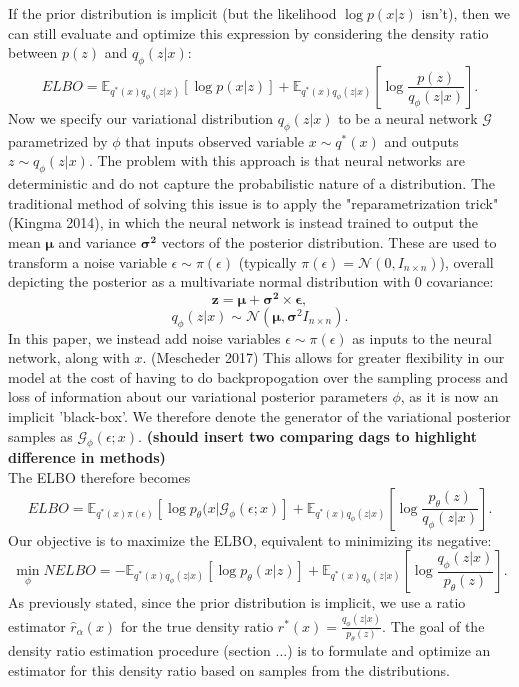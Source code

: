 \documentclass[a4paper,12pt]{article}
\numberwithin{equation}{section}
\begin{document}
If the prior distribution is implicit (but the likelihood $\log p(x|z)$ isn't), then we can still evaluate and optimize this expression by considering the density ratio between $p(z)$ and $q_\phi (z|x)$:
\[ELBO = \mathbb{E}_{q^*(x)q_\phi(z|x)}\left[\log p(x|z)\right]+\mathbb{E}_{q^*(x)q_\phi(z|x)}\left[\log \frac{p(z)}{q_\phi(z|x)}\right].\]
Now we specify our variational distribution $q_\phi(z|x)$ to be a neural network $\mathcal{G}$ parametrized by $\phi$ that inputs observed variable $x\sim q^*(x)$ and outputs $z\sim q_\phi(z|x)$.
The problem with this approach is that neural networks are deterministic and do not capture the probabilistic nature of a distribution. The traditional method of solving this issue is to apply the "reparametrization trick" (Kingma 2014), in which the neural network is instead trained to output the mean $\bm{\mu}$ and variance $\bm{\sigma^2}$ vectors of the posterior distribution. These are used to transform a noise variable $\epsilon \sim \pi(\epsilon)$ (typically $\pi(\epsilon) = \mathcal{N}(0,I_{n\times n})$), overall depicting the posterior as a multivariate normal distribution with 0 covariance:
\[\bm{z}=\bm{\mu}+\bm{\sigma^2}\times \bm{\epsilon},\]
\[q_\phi(z|x)\sim \mathcal{N}(\bm{\mu},\bm{\sigma}^2I_{n\times n}).\]
In this paper, we instead add noise variables $\epsilon \sim \pi(\epsilon)$ as inputs to the neural network, along with $x$. (Mescheder 2017) This allows for greater flexibility in our model at the cost of having to do backpropogation over the sampling process and loss of information about our variational posterior parameters $\phi$, as it is now an implicit 'black-box'. We therefore denote the generator of the variational posterior samples as $\mathcal{G}_\phi(\epsilon;x)$. \textbf{(should insert two comparing dags to highlight difference in methods)} \\
The ELBO therefore becomes
\[ELBO = \mathbb{E}_{q^*(x)\pi(\epsilon)}[\log p_\theta (x|\mathcal{G}_\phi(\epsilon;x)]+\mathbb{E}_{q^*(x)q_\phi(z|x)}\left[\log \frac{p_\theta(z)}{q_\phi(z|x)}\right].\]
Our objective is to maximize the ELBO, equivalent to minimizing its negative:
\[\min_\phi NELBO = -\mathbb{E}_{q^*(x)q_\phi(z|x)}\left[\log p_\theta(x|z)\right]+\mathbb{E}_{q^*(x)q_\phi(z|x)}\left[\log \frac{q_\phi(z|x)}{p_\theta(z)}\right].\]
As previously stated, since the prior distribution is implicit, we use a ratio estimator $\hat{r}_\alpha(x)$ for the true density ratio $r^*(x)=\frac{q_\phi(z|x)}{p_\theta(z)}$. The goal of the density ratio estimation procedure (section ...) is to formulate and optimize an estimator for this density ratio based on samples from the distributions.
\newpage
\end{document}

